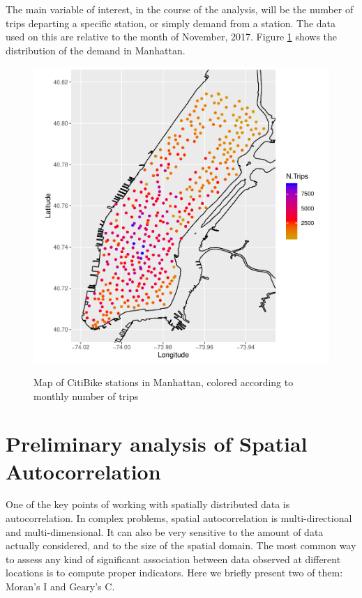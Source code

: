 \documentclass[12pt]{article}
\begin{document}
\noindent
The main variable of interest, in the course of the analysis, will be the number of trips departing a specific station, or simply demand from a station. The data used on this are relative to the month of November, 2017.
Figure \ref{manhattan_demand} shows the distribution of the demand in Manhattan.


\begin{figure}[H]
	\centering
	\includegraphics[scale=.9]{Pictures/solomanhattan.pdf}\\
	\caption{Map of CitiBike stations in Manhattan, colored according to monthly number of trips} \label{manhattan_demand}
\end{figure}


\section{Preliminary analysis of Spatial Autocorrelation}

One of the key points of working with spatially distributed data is autocorrelation. In complex problems, spatial autocorrelation is multi-directional and multi-dimensional. It can also be very sensitive to the amount of data actually considered, and to the size of the spatial domain.
The most common way to assess any kind of significant association between data observed at different locations is to compute proper indicators. Here we briefly present two of them: Moran's I and Geary's C.
	
\end{document}
